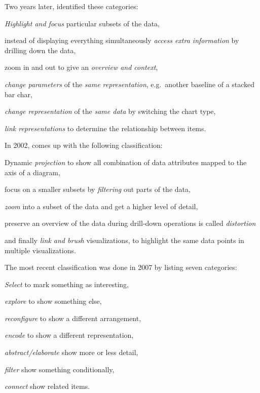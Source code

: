 Two years later, \textcite{Dix1998} identified these categories:
\begin{enumerate*}[label=(\arabic*)]
  \item
    \emph{Highlight and focus} particular subsets of the data,
  \item
    instead of displaying everything simultaneously \emph{access extra information} by drilling down the data,
  \item
    zoom in and out to give an \emph{overview and context},
  \item
    \emph{change parameters} of the \emph{same representation}, e.g.\ another baseline of a stacked bar char,
  \item
    \emph{change representation} of the \emph{same data} by switching the chart type,
  \item
    \emph{link representations} to determine the relationship between items.
\end{enumerate*}

In 2002, \textcite{Keim2002} comes up with the following classification:
\begin{enumerate*}[label=(\arabic*)]
  \item
    Dynamic \emph{projection} to show all combination of data attributes mapped to the axis of a diagram,
  \item
    focus on a smaller subsets by \emph{filtering} out parts of the data,
  \item
    \emph{zoom} into a subset of the data and get a higher level of detail,
  \item
    preserve an overview of the data during drill-down operations is called \emph{distortion}
  \item
    and finally \emph{link and brush} visualizations, to highlight the same data points in multiple visualizations.
\end{enumerate*}

The most recent classification was done in 2007 by \textcite{Yi2007} listing seven categories:
\begin{enumerate*}[label=(\arabic*)]
  \item
    \emph{Select} to mark something as interesting,
  \item
    \emph{explore} to show something else,
  \item
    \emph{reconfigure} to show a different arrangement,
  \item
    \emph{encode} to show a different representation,
  \item
    \emph{abstract/elaborate} show more or less detail,
  \item
    \emph{filter} show something conditionally,
  \item
    \emph{connect} show related items.
\end{enumerate*}

